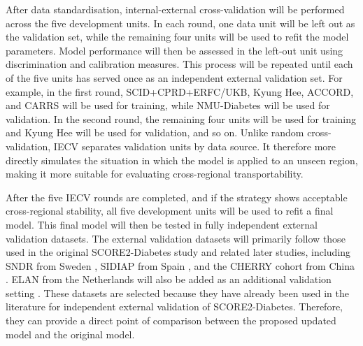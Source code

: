 \documentclass[conference]{IEEEtran}
\begin{document}
After data standardisation, internal-external cross-validation will be performed across the five development units. In each round, one data unit will be left out as the validation set, while the remaining four units will be used to refit the model parameters. Model performance will then be assessed in the left-out unit using discrimination and calibration measures. This process will be repeated until each of the five units has served once as an independent external validation set. For example, in the first round, SCID+CPRD+ERFC/UKB, Kyung Hee, ACCORD, and CARRS will be used for training, while NMU-Diabetes will be used for validation. In the second round, the remaining four units will be used for training and Kyung Hee will be used for validation, and so on. Unlike random cross-validation, IECV separates validation units by data source. It therefore more directly simulates the situation in which the model is applied to an unseen region, making it more suitable for evaluating cross-regional transportability.

After the five IECV rounds are completed, and if the strategy shows acceptable cross-regional stability, all five development units will be used to refit a final model. This final model will then be tested in fully independent external validation datasets. The external validation datasets will primarily follow those used in the original SCORE2-Diabetes study and related later studies, including SNDR from Sweden \cite{gudbjornsdottir2003national}, SIDIAP from Spain \cite{bolibar2012sidiap}, and the CHERRY cohort from China \cite{lin2018using}. ELAN from the Netherlands will also be added as an additional validation setting \cite{alfaraj2025external}. These datasets are selected because they have already been used in the literature for independent external validation of SCORE2-Diabetes. Therefore, they can provide a direct point of comparison between the proposed updated model and the original model.
\end{document}
